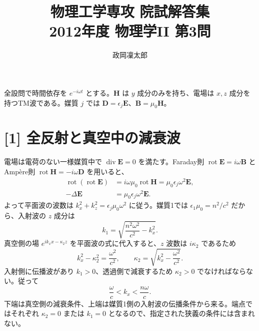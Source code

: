 \documentclass[11pt,a4paper]{article}
\title{物理工学専攻 院試解答集\\2012年度 物理学II 第3問}
\author{政岡凜太郎}
\date{}
\begin{document}
\maketitle

全設問で時間依存を $e^{-i\omega t}$ とする。$\boldsymbol H$ は $y$ 成分のみを持ち、電場は $x,z$ 成分を持つTM波である。媒質 $j$ では $\boldsymbol D=\epsilon_j\boldsymbol E$、$\boldsymbol B=\mu_0\boldsymbol H$。

\section*{[1] 全反射と真空中の減衰波}
電場は電荷のない一様媒質中で $\operatorname{div}\boldsymbol E=0$ を満たす。Faraday則 $\operatorname{rot}\boldsymbol E=i\omega\boldsymbol B$ と Amp\`ere則 $\operatorname{rot}\boldsymbol H=-i\omega\boldsymbol D$ を用いると、
\begin{align}
  \operatorname{rot}(\operatorname{rot}\boldsymbol E)
  &=i\omega\mu_0\operatorname{rot}\boldsymbol H
   =\mu_0\epsilon_j\omega^2\boldsymbol E,\\
  -\Delta\boldsymbol E&=\mu_0\epsilon_j\omega^2\boldsymbol E.
\end{align}
よって平面波の波数は $k_x^2+k_z^2=\epsilon_j\mu_0\omega^2$ に従う。媒質1では $\epsilon_1\mu_0=n^2/c^2$ だから、入射波の $z$ 成分は
\begin{equation}
  \boxed{k_1=\sqrt{\frac{n^2\omega^2}{c^2}-k_x^2}}.
\end{equation}
真空側の場 $e^{ik_xx-\kappa_2z}$ を平面波の式に代入すると、$z$ 波数は $i\kappa_2$ であるため
\begin{equation}
  k_x^2-\kappa_2^2=\frac{\omega^2}{c^2},\qquad
  \boxed{\kappa_2=\sqrt{k_x^2-\frac{\omega^2}{c^2}}}.
\end{equation}
入射側に伝播波があり $k_1>0$、透過側で減衰するため $\kappa_2>0$ でなければならない。従って
\begin{equation}
  \boxed{\frac{\omega}{c}<k_x<\frac{n\omega}{c}}.
\end{equation}
下端は真空側の減衰条件、上端は媒質1側の入射波の伝播条件から来る。端点ではそれぞれ $\kappa_2=0$ または $k_1=0$ となるので、指定された狭義の条件には含まれない。
\end{document}
